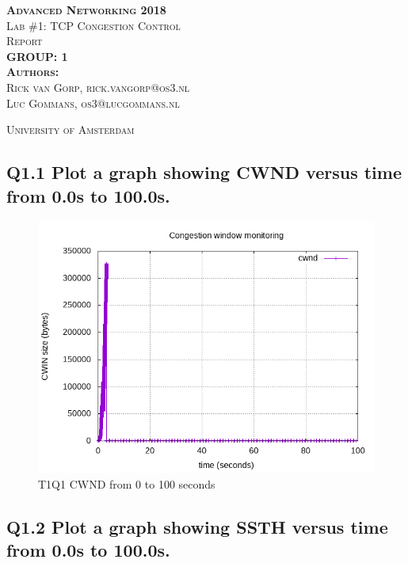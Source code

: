 \documentclass{article}
\begin{document}
\begin{titlepage}
\begin{center}
\textsc{\huge \bfseries Advanced Networking 2018}\\[1.5cm]
\textsc{\large Lab \#1: TCP Congestion Control}\\[1.5cm]
\textsc{\huge Report}\\[1.5cm]
\textsc{\huge \bfseries GROUP: 1}\\[1.5cm]
\textsc{\large{\textbf{Authors:}\\ Rick van Gorp, rick.vangorp@os3.nl\\ Luc Gommans, os3@lucgommans.nl}}

\textsc{\large University of Amsterdam}
\end{center}
\end{titlepage}

\subsection{Q1.1 Plot a graph showing CWND versus time from 0.0s to 100.0s.}

\begin{figure}[H]
	\includegraphics{lab1-group1-task1-question1.png}
	\caption{T1Q1 CWND from 0 to 100 seconds}
\end{figure}



\subsection{Q1.2 Plot a graph showing SSTH versus time from 0.0s to 100.0s.}
\end{document}
